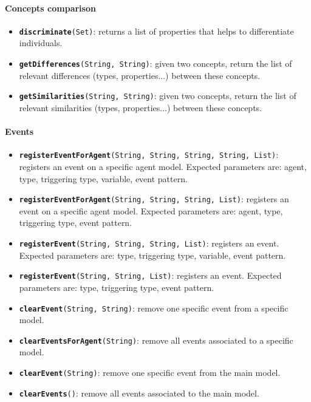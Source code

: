 \paragraph{Concepts comparison}
\begin{itemize}

    \item {\tt {\bf discriminate}(Set)}: returns a list of properties that
    helps to differentiate individuals.

    \item {\tt {\bf getDifferences}(String, String)}: given two concepts,
    return the list of relevant differences (types, properties...) between
    these concepts.

    \item {\tt {\bf getSimilarities}(String, String)}: given two concepts,
    return the list of relevant similarities (types, properties...) between
    these concepts.
\end{itemize}

\paragraph{Events}
\begin{itemize}

    \item {\tt {\bf registerEventForAgent}(String, String, String, String,
    List)}: registers an event on a specific agent model. Expected parameters
    are: agent, type, triggering type, variable, event pattern.

    \item {\tt {\bf registerEventForAgent}(String, String, String, List)}:
    registers an event on a specific agent model. Expected parameters are:
    agent, type, triggering type, event pattern.

    \item {\tt {\bf registerEvent}(String, String, String, List)}: registers an
    event. Expected parameters are: type, triggering type, variable, event
    pattern.

    \item {\tt {\bf registerEvent}(String, String, List)}: registers an event.
    Expected parameters are: type, triggering type, event pattern.

    \item {\tt {\bf clearEvent}(String, String)}: remove one specific event
    from a specific model.

    \item {\tt {\bf clearEventsForAgent}(String)}: remove all events associated
    to a specific model.

    \item {\tt {\bf clearEvent}(String)}: remove one specific event from the
    main model.

    \item {\tt {\bf clearEvents}()}: remove all events associated to the main
    model.
\end{itemize}


